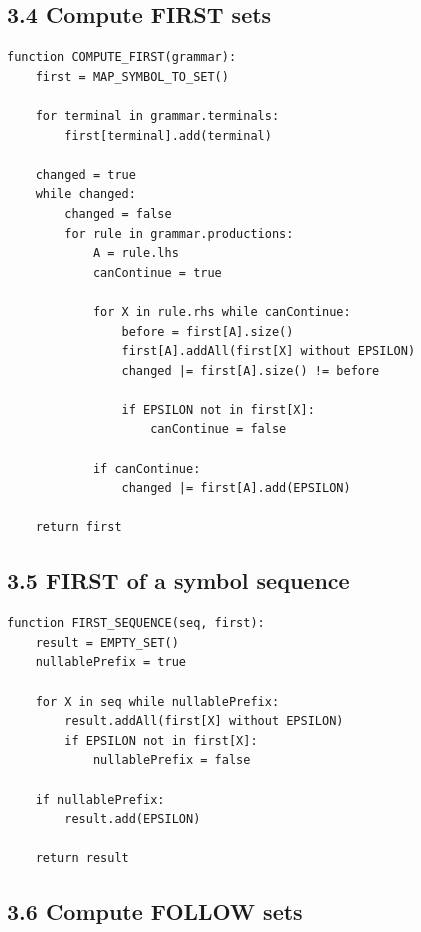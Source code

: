 \documentclass[10pt,letterpaper]{article}
\begin{document}
\subsection*{3.4 Compute FIRST sets}

\begin{verbatim}
function COMPUTE_FIRST(grammar):
    first = MAP_SYMBOL_TO_SET()

    for terminal in grammar.terminals:
        first[terminal].add(terminal)

    changed = true
    while changed:
        changed = false
        for rule in grammar.productions:
            A = rule.lhs
            canContinue = true

            for X in rule.rhs while canContinue:
                before = first[A].size()
                first[A].addAll(first[X] without EPSILON)
                changed |= first[A].size() != before

                if EPSILON not in first[X]:
                    canContinue = false

            if canContinue:
                changed |= first[A].add(EPSILON)

    return first
\end{verbatim}

\subsection*{3.5 FIRST of a symbol sequence}

\begin{verbatim}
function FIRST_SEQUENCE(seq, first):
    result = EMPTY_SET()
    nullablePrefix = true

    for X in seq while nullablePrefix:
        result.addAll(first[X] without EPSILON)
        if EPSILON not in first[X]:
            nullablePrefix = false

    if nullablePrefix:
        result.add(EPSILON)

    return result
\end{verbatim}

\subsection*{3.6 Compute FOLLOW sets}
\end{document}
